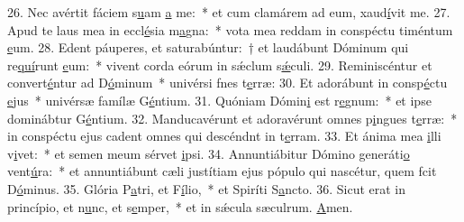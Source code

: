 26. Nec avértit fáciem s\uline{u}am \uline{a} me:~* et cum clamárem ad eum, xaud\uline{í}vit me.
27. Apud te laus mea in eccl\uline{é}sia m\uline{a}gna:~* vota mea reddam in conspéctu timéntum \uline{e}um.
28. Edent páuperes, et saturabúntur:~† et laudábunt Dóminum qui re\uline{quí}runt \uline{e}um:~* vivent corda eórum in sǽclum s\uline{ǽ}culi.
29. Reminiscéntur et convert\uline{é}ntur ad D\uline{ó}minum~* univérsi fnes t\uline{e}rræ:
30. Et adorábunt in consp\uline{é}ctu \uline{e}jus~* univérsæ famílæ G\uline{é}ntium.
31. Quóniam Dómin\uline{i} est r\uline{e}gnum:~* et ipse dominábtur G\uline{é}ntium.
32. Manducavérunt et adoravérunt omnes p\uline{i}ngues t\uline{e}rræ:~* in conspéctu ejus cadent omnes qui descéndnt in t\uline{e}rram.
33. Et ánima mea \uline{i}lli v\uline{i}vet:~* et semen meum sérvet \uline{i}psi.
34. Annuntiábitur Dómino generáti\uline{o} vent\uline{ú}ra:~* et annuntiábunt cæli justítiam ejus pópulo qui nascétur, quem fcit D\uline{ó}minus.
35. Glória P\uline{a}tri, et F\uline{í}lio,~* et Spiríti S\uline{a}ncto.
36. Sicut erat in princípio, et n\uline{u}nc, et s\uline{e}mper,~* et in sǽcula sæculrum. \uline{A}men.
